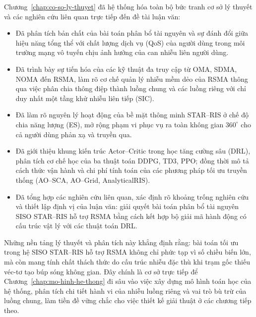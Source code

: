 Chương~\ref{chap:co-so-ly-thuyet} đã hệ thống hóa toàn bộ bức tranh cơ sở lý thuyết và các nghiên cứu liên
quan trực tiếp đến đề tài luận văn:
\begin{itemize}
\item Đã phân tích bản chất của bài toán phân bổ tài nguyên và sự đánh đổi giữa hiệu năng tổng thể với chất
  lượng dịch vụ (QoS) của người dùng trong môi trường mạng vô tuyến chịu ảnh hưởng của can nhiễu liên người
  dùng.
\item Đã trình bày sự tiến hóa của các kỹ thuật đa truy cập từ OMA, SDMA, NOMA đến RSMA, làm rõ cơ chế quản
  lý nhiễu mềm dẻo của RSMA thông qua việc phân chia thông điệp thành luồng chung và các luồng riêng với chỉ
  duy nhất một tầng khử nhiễu liên tiếp (SIC).
\item Đã làm rõ nguyên lý hoạt động của bề mặt thông minh STAR--RIS ở chế độ chia năng lượng (ES), mở rộng
  phạm vi phục vụ ra toàn không gian $360^\circ$ cho cả người dùng phản xạ và truyền qua.
\item Đã giới thiệu khung kiến trúc Actor--Critic trong học tăng cường sâu (DRL), phân tích cơ chế học của
  ba thuật toán DDPG, TD3, PPO; đồng thời mô tả cách thức vận hành và chi phí tính toán của các phương pháp
  tối ưu truyền thống (AO--SCA, AO--Grid, AnalyticalRIS).
\item Đã tổng hợp các nghiên cứu liên quan, xác định rõ khoảng trống nghiên cứu và thiết lập định vị của luận
  văn: giải quyết bài toán phân bổ tài nguyên SISO STAR--RIS hỗ trợ RSMA bằng cách kết hợp bộ giải mã hành
  động có cấu trúc vật lý với các thuật toán DRL.
\end{itemize}
Những nền tảng lý thuyết và phân tích này khẳng định rằng: bài toán tối ưu trong hệ SISO STAR--RIS hỗ trợ
RSMA không chỉ phức tạp vì số chiều biến lớn, mà còn mang tính chất thách thức do cấu trúc nhiễu đặc thù khi
trạm gốc thiếu véc-tơ tạo búp sóng không gian. Đây chính là cơ sở trực tiếp để
Chương~\ref{chap:mo-hinh-he-thong} đi sâu vào việc xây dựng mô hình toán học của hệ thống, phân tích chi tiết
hành vi của nhiễu luồng riêng và vai trò bù trừ của luồng chung, làm tiền đề vững chắc cho việc thiết kế
giải thuật ở các chương tiếp theo.
